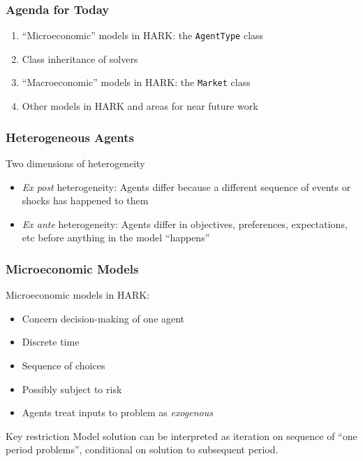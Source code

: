 \documentclass[11pt,handout]{beamer}
\newcommand{\bi}{\begin{itemize}}
\newcommand{\ei}{\end{itemize}}
\begin{document}
\begin{frame}
\frametitle{Agenda for Today}
\begin{enumerate}
\item ``Microeconomic'' models in HARK: the \texttt{AgentType} class

\item Class inheritance of solvers

\item ``Macroeconomic'' models in HARK: the \texttt{Market} class

\item Other models in HARK and areas for near future work
\end{enumerate}
\end{frame}

\begin{frame}
\frametitle{Heterogeneous Agents}
\begin{block}{Two dimensions of heterogeneity}
\bi
\item \textit{Ex post} heterogeneity: Agents differ because a different sequence of events or shocks has happened to them

\item \textit{Ex ante} heterogeneity: Agents differ in objectives, preferences, expectations, etc before anything in the model ``happens''
\ei
\end{block}

\end{frame}


\begin{frame}
\frametitle{Microeconomic Models}
\begin{block}{Microeconomic models in HARK:}
\bi
\item Concern decision-making of one agent

\item Discrete time

\item Sequence of choices

\item Possibly subject to risk

\item Agents treat inputs to problem as \textit{exogenous}
\ei
\end{block}

\begin{block}{Key restriction}
Model solution can be interpreted as iteration on sequence of ``one period problems'', conditional on solution to subsequent period.
\end{block}
\end{frame}
\end{document}
